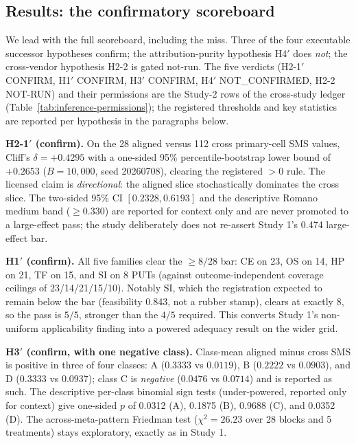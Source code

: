 \documentclass[manuscript,screen,review]{acmart}
\begin{document}
\subsection{Results: the confirmatory scoreboard}\label{study2-scoreboard}

We lead with the full scoreboard, including the miss. Three of the four
executable successor hypotheses confirm; the attribution-purity
hypothesis H4\('\) does \emph{not}; the cross-vendor hypothesis H2-2 is
gated not-run. The five verdicts (H2-1\('\) CONFIRM, H1\('\) CONFIRM,
H3\('\) CONFIRM, H4\('\) NOT\_CONFIRMED, H2-2 NOT-RUN) and their permissions
are the Study-2 rows of the cross-study ledger
(Table~\ref{tab:inference-permissions}); the registered thresholds and key
statistics are reported per hypothesis in the paragraphs below.

\textbf{H2-1\('\) (confirm).} On the 28 aligned versus 112 cross
primary-cell SMS values, Cliff's \(\delta = +0.4295\) with a one-sided
95\% percentile-bootstrap lower bound of \(+0.2653\) (\(B = 10{,}000\),
seed 20260708), clearing the registered \(>0\) rule. The licensed claim
is \emph{directional}: the aligned slice stochastically dominates the
cross slice. The two-sided 95\% CI \([0.2328, 0.6193]\) and the
descriptive Romano medium band (\(\geq 0.330\)) are reported for context
only and are never promoted to a large-effect pass; the study
deliberately does not re-assert Study 1's 0.474 large-effect bar.

\textbf{H1\('\) (confirm).} All five families clear the \(\geq 8/28\)
bar: CE on 23, OS on 14, HP on 21, TF on 15, and SI on 8 PUTs (against
outcome-independent coverage ceilings of 23/14/21/15/10). Notably SI,
which the registration expected to remain below the bar (feasibility
0.843, not a rubber stamp), clears at exactly 8, so the pass is
\(5/5\), stronger than the \(4/5\) required. This converts Study 1's
non-uniform applicability finding into a powered adequacy result on the
wider grid.

\textbf{H3\('\) (confirm, with one negative class).} Class-mean aligned
minus cross SMS is positive in three of four classes: A
(\(0.3333\) vs \(0.0119\)), B (\(0.2222\) vs \(0.0903\)), and D
(\(0.3333\) vs \(0.0937\)); class C is \emph{negative}
(\(0.0476\) vs \(0.0714\)) and is reported as such. The descriptive
per-class binomial sign tests (under-powered, reported only for context)
give one-sided \(p\) of 0.0312 (A), 0.1875 (B), 0.9688 (C), and 0.0352
(D). The across-meta-pattern Friedman test
(\(\chi^2 = 26.23\) over 28 blocks and 5 treatments) stays exploratory,
exactly as in Study 1.
\end{document}
